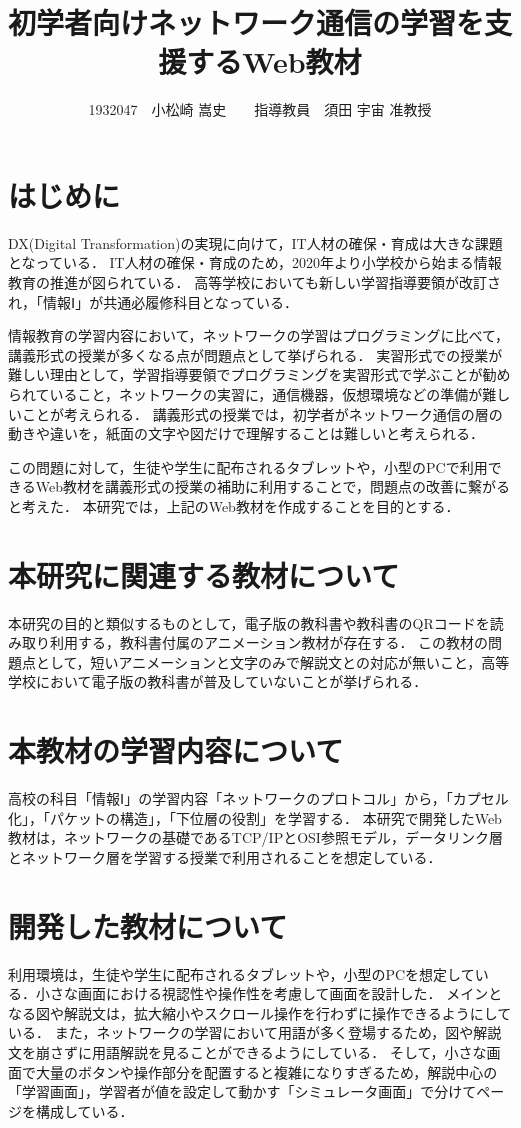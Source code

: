 \documentclass[twocolumn,10pt,a4j]{ltjsarticle}
\title{初学者向けネットワーク通信の学習を支援するWeb教材}
\author{1932047　小松崎 嵩史　　指導教員　須田 宇宙 准教授}
\date{}
\begin{document}
\maketitle

\section{はじめに}

DX(Digital Transformation)の実現に向けて，IT人材の確保・育成は大きな課題となっている\cite{dx}．
IT人材の確保・育成のため，2020年より小学校から始まる情報教育の推進が図られている．
高等学校においても新しい学習指導要領が改訂され，「情報Ⅰ」が共通必履修科目となっている．


情報教育の学習内容において，ネットワークの学習はプログラミングに比べて，講義形式の授業が多くなる点が問題点として挙げられる．
実習形式での授業が難しい理由として，学習指導要領でプログラミングを実習形式で学ぶことが勧められていること，ネットワークの実習に，通信機器，仮想環境などの準備が難しいことが考えられる．
講義形式の授業では，初学者がネットワーク通信の層の動きや違いを，紙面の文字や図だけで理解することは難しいと考えられる．

この問題に対して，生徒や学生に配布されるタブレットや，小型のPCで利用できるWeb教材を講義形式の授業の補助に利用することで，問題点の改善に繋がると考えた．
本研究では，上記のWeb教材を作成することを目的とする．

\section{本研究に関連する教材について}
本研究の目的と類似するものとして，電子版の教科書や教科書のQRコードを読み取り利用する，教科書付属のアニメーション教材が存在する．
この教材の問題点として，短いアニメーションと文字のみで解説文との対応が無いこと，高等学校において電子版の教科書が普及していないことが挙げられる．

\section{本教材の学習内容について}
高校の科目「情報Ⅰ」の学習内容「ネットワークのプロトコル」から，「カプセル化」，「パケットの構造」，「下位層の役割」を学習する．
本研究で開発したWeb教材は，ネットワークの基礎であるTCP/IPとOSI参照モデル，データリンク層とネットワーク層を学習する授業で利用されることを想定している．

\section{開発した教材について}
利用環境は，生徒や学生に配布されるタブレットや，小型のPCを想定している．小さな画面における視認性や操作性を考慮して画面を設計した．
メインとなる図や解説文は，拡大縮小やスクロール操作を行わずに操作できるようにしている．
また，ネットワークの学習において用語が多く登場するため，図や解説文を崩さずに用語解説を見ることができるようにしている．
そして，小さな画面で大量のボタンや操作部分を配置すると複雑になりすぎるため，解説中心の「学習画面」，学習者が値を設定して動かす「シミュレータ画面」で分けてページを構成している．
\end{document}
